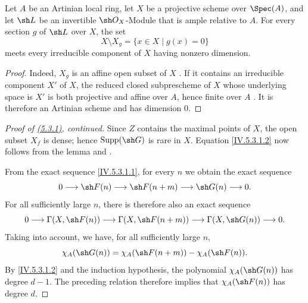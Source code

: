 \begin{lemma}[5.3.1.3]
\label{IV.5.3.1.3}
Let $A$ be an Artinian local ring, let $X$ be a projective scheme over
$\Spec(A)$, and let $\sh L$ be an invertible $\sh O_X$-Module that is
ample relative to $A$.
For every section $g$ of $\sh L$ over $X$, the set
\[
X\setminus X_g=\{x\in X\mid g(x)=0\}
\]
meets every irreducible component of $X$ having nonzero dimension.
\end{lemma}

\begin{proof}
Indeed, $X_g$ is an affine open subset of $X$
.
If it contains an irreducible component $X'$ of $X$, the reduced
closed subprescheme of $X$ whose underlying space is $X'$ is both
projective and affine over $A$, hence finite over $A$
.
It is therefore an Artinian scheme and has dimension $0$.
\end{proof}

\begin{proof}[Proof of \emph{{\hyperref[IV.5.3.1]{(5.3.1)}}}, continued]
Since $Z$ contains the maximal points of $X$, the open subset $X_f$
is dense; hence $\operatorname{Supp}(\sh G)$ is rare in $X$.
Equation \eqref{IV.5.3.1.2} now follows from the lemma and
.


From the exact sequence \eqref{IV.5.3.1.1}, for every $n$ we obtain
the exact sequence
\[
0\longrightarrow\sh F(n)
 \longrightarrow\sh F(n+m)
 \longrightarrow\sh G(n)
 \longrightarrow0.
\]
For all sufficiently large $n$, there is therefore also an exact
sequence 
\[
0\longrightarrow\Gamma(X,\sh F(n))
 \longrightarrow\Gamma(X,\sh F(n+m))
 \longrightarrow\Gamma(X,\sh G(n))
 \longrightarrow0.
\]
Taking  into account, we have, for all
sufficiently large $n$,
\[
\chi_A(\sh G(n))
  =\chi_A(\sh F(n+m))-\chi_A(\sh F(n)).
\]
By \eqref{IV.5.3.1.2} and the induction hypothesis, the polynomial
$\chi_A(\sh G(n))$ has degree $d-1$.
The preceding relation therefore implies that
$\chi_A(\sh F(n))$ has degree $d$.
\end{proof}
